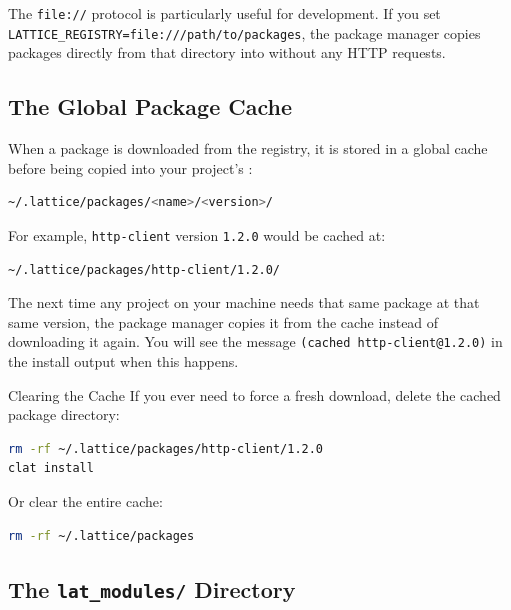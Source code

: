 The \lstinline|file://| protocol is particularly useful for development.
If you set \lstinline|LATTICE_REGISTRY=file:///path/to/packages|, the package manager copies packages directly from that directory into  without any HTTP requests.

\subsection{The Global Package Cache}\label{subsec:global-cache}

When a package is downloaded from the registry, it is stored in a global cache before being copied into your project's :

\begin{lstlisting}[language=bash, numbers=none]
~/.lattice/packages/<name>/<version>/
\end{lstlisting}

For example, \texttt{http-client} version \texttt{1.2.0} would be cached at:

\begin{lstlisting}[language=bash, numbers=none]
~/.lattice/packages/http-client/1.2.0/
\end{lstlisting}

The next time any project on your machine needs that same package at that same version, the package manager copies it from the cache instead of downloading it again.
You will see the message \texttt{(cached http-client@1.2.0)} in the install output when this happens.

\begin{tipbox}{Clearing the Cache}
If you ever need to force a fresh download, delete the cached package directory:

\begin{lstlisting}[language=bash, numbers=none]
rm -rf ~/.lattice/packages/http-client/1.2.0
clat install
\end{lstlisting}

Or clear the entire cache:

\begin{lstlisting}[language=bash, numbers=none]
rm -rf ~/.lattice/packages
\end{lstlisting}
\end{tipbox}

\subsection{The \texttt{lat\_modules/} Directory}\label{subsec:lat-modules-dir}

